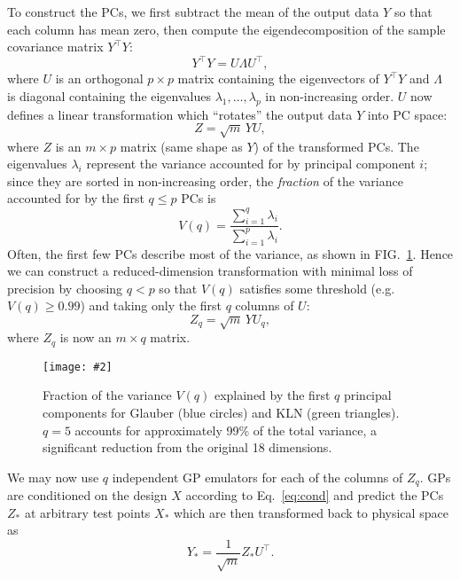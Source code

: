 \documentclass[aps,prc,reprint,superscriptaddress,amsmath]{revtex4-1}
\newcommand{\colfig}[3][t]{
  \begin{figure}[#1]
    \texttt{[image: \#2]}
    \caption{\label{fig:#2}#3}
  \end{figure}
}
\newcommand{\tran}{^\intercal}
\begin{document}
To construct the PCs, we first subtract the mean of the output data $Y$ so that each column has mean zero, then compute the eigendecomposition of the sample covariance matrix $Y\tran Y$:
\begin{equation}
  Y\tran Y = U \Lambda U\tran,
  \label{eq:cov}
\end{equation}
where $U$ is an orthogonal $p \times p$ matrix containing the eigenvectors of $Y\tran Y$ and $\Lambda$ is diagonal containing the eigenvalues $\lambda_1, \ldots, \lambda_p$ in non-increasing order.
$U$ now defines a linear transformation which ``rotates'' the output data $Y$ into PC space:
\begin{equation}
  Z = \sqrt m \, YU,
\end{equation}
where $Z$ is an $m \times p$ matrix (same shape as $Y$) of the transformed PCs.
The eigenvalues $\lambda_i$ represent the variance accounted for by principal component $i$; since they are sorted in non-increasing order, the \emph{fraction} of the variance accounted for by the first $q \leq p$ PCs is
\begin{equation}
  V(q) = \frac{\sum_{i=1}^q \lambda_i}{\sum_{i=1}^p \lambda_i}.
\end{equation}
Often, the first few PCs describe most of the variance, as shown in FIG.~\ref{fig:pc_var}.
Hence we can construct a reduced-dimension transformation with minimal loss of precision by choosing $q < p$ so that $V(q)$ satisfies some threshold (e.g.~$V(q) \geq 0.99$) and taking only the first $q$ columns of $U$:
\begin{equation}
  Z_q = \sqrt m \, YU_q,
\end{equation}
where $Z_q$ is now an $m \times q$ matrix.

\colfig{pc_var}{
  Fraction of the variance $V(q)$ explained by the first $q$ principal components for Glauber (blue circles) and KLN (green triangles).
  $q = 5$ accounts for approximately 99\% of the total variance, a significant reduction from the original 18 dimensions.
}

We may now use $q$ independent GP emulators for each of the columns of $Z_q$.
GPs are conditioned on the design $X$ according to Eq.~\eqref{eq:cond} and predict the PCs $Z_*$ at arbitrary test points $X_*$ which are then transformed back to physical space as
\begin{equation}
  Y_* = \frac{1}{\sqrt m} Z_* U\tran.
\end{equation}
\end{document}
